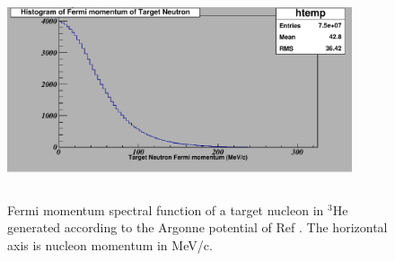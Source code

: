 \begin{figure}[!hbt]
    \centering
    \includegraphics[width=4.0in,height=2.5in]{./figures/Fermi.pdf}
    \caption{Fermi momentum spectral function of a target nucleon in $^3$He generated according to the Argonne 
    potential of Ref \cite{fermipaper}.  The horizontal axis is nucleon momentum in MeV/c.}
    \label{fig:fermi}
\end{figure}
